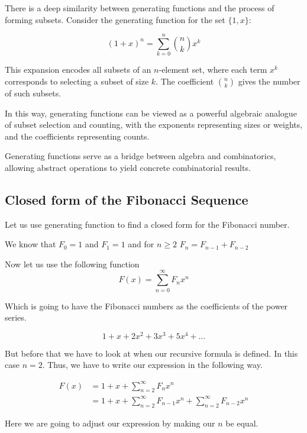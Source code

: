 There is a deep similarity between generating functions and the process of forming subsets. Consider the 
generating function for the set \( \{1, x\} \):

\[
    {(1 + x)}^n = \sum_{k=0}^n \binom{n}{k} x^k
\]

This expansion encodes all subsets of an \(n\)-element set, where each term \( x^k \) corresponds to 
selecting a subset of size \(k\). The coefficient \( \binom{n}{k} \) gives the number of such subsets.
\vspace{\baselineskip}

In this way, generating functions can be viewed as a powerful algebraic analogue of subset selection and 
counting, with the exponents representing sizes or weights, and the coefficients representing counts.
\vspace{\baselineskip}

Generating functions serve as a bridge between algebra and combinatorics, allowing abstract operations to 
yield concrete combinatorial results.

\subsection{Closed form of the Fibonacci Sequence}

Let us use generating function to find a closed form for the Fibonacci number. 
\vspace{\baselineskip}

We know that \(F_0 = 1\) and \(F_1 = 1\) and for \(n \ge 2\) \(F_n = F_{n-1} + F_{n-2}\)
\vspace{\baselineskip}

Now let us use the following function
\[
    F(x) = \sum_{n = 0}^{\infty} F_n x^{n}
\]

Which is going to have the Fibonacci numbers as the coefficients of the power series.

\[
    1 + x + 2x^2 + 3x^3 + 5x^4 + \dots
\]

But before that we have to look at when our recursive formula is defined.
In this case \(n = 2\). Thus, we have to write our expression in the following way.

\begin{align*}
    F(x) &= 1 + x + \sum_{n = 2}^{\infty} F_n x^{n}\\
    &= 1 + x + \sum_{n = 2}^{\infty} F_{n -1} x^{n} + \sum_{n = 2}^{\infty} F_{n - 2}x^n 
\end{align*}

Here we are going to adjust our expression by making our \(n\) be equal.

